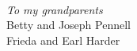 \cleardoublepage
{}
{}
\vspace*{190pt}
\begingroup
\begin{center}
{\large{}}\\
\bigskip
\textit{To my grandparents}\\
Betty and Joseph Pennell\\
Frieda and Earl Harder
\end{center}
\endgroup
\vspace*{\fill}
